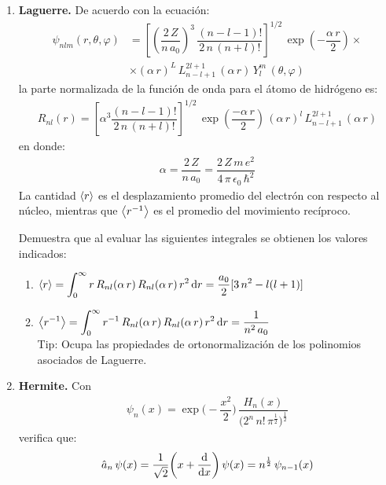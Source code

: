 \begin{enumerate}
\item \textbf{Laguerre. } De acuerdo con la ecuación:
\begin{align*}
\psi_{n l m} (r , \theta, \varphi) &= \left[ \left( \dfrac{2 \, Z}{n \, a_{0}} \right)^{3} \, \dfrac{(n - l -1)!}{2 \, n \, (n + l)!} \right]^{1/2} \, \exp \left( - \dfrac{\alpha \, r}{2} \right) \times \\[1em]
&\times (\alpha \, r)^{L} \, L_{n - l +1}^{2 l +1} \, (\alpha \, r) \, Y_{l}^{m} \, (\theta, \varphi)
\end{align*}
la parte normalizada de la función de onda para el átomo de hidrógeno es:
\begin{align*}
R_{n l} (r) = \left[ \alpha^{3} \dfrac{(n -l -1)!}{2 \, n \, (n + l)!} \right]^{1/2} \, \exp \left( \dfrac{-\alpha \, r}{2} \right) \, (\alpha \, r)^{l} \, L_{n - l +1}^{2 l +1} \, (\alpha \, r) 
\end{align*}
en donde: 
\begin{align*}
\alpha = \dfrac{2 \, Z}{n \, a_{0}} = \dfrac{2 \, Z \, m \, e^{2}}{4 \, \pi \, \epsilon_{0} \, \hbar^{2}}
\end{align*}
La cantidad $\expval{r}$ es el desplazamiento promedio del electrón con respecto al núcleo, mientras que $\expval{r^{-1}}$ es el promedio del movimiento recíproco.
\par
Demuestra que al evaluar las siguientes integrales se obtienen los valores indicados:
\begin{enumerate}
\item $\displaystyle \expval{r} = \int_{0}^{\infty} r \, R_{n l} (\alpha \, r) \, R_{n l} (\alpha \, r) \, r^{2} \dd{r} = \dfrac{a_{0}}{2} [3 \, n^{2} - l (l + 1)]$
\item $\displaystyle \expval{r^{-1}} = \int_{0}^{\infty} r^{-1} \, R_{n l} (\alpha \, r) \, R_{n l} (\alpha \, r) \, r^{2} \dd{r} = \dfrac{1}{n^{2} \, a_{0}}$
\\[0.5em]
Tip: Ocupa las propiedades de ortonormalización de los polinomios asociados de Laguerre.
\end{enumerate}
\item \textbf{Hermite. }Con
\begin{align*}
\psi_{n} (x) = \exp \bigg( - \dfrac{x^{2}}{2} \bigg) \, \dfrac{H_{n}(x)}{\big( 2^{n} \, n! \, \pi^{\frac{1}{2}})^{\frac{1}{2}}}
\end{align*}
verifica que:
\begin{align*}
\hat{a}_{n} \, \psi (x) &= \dfrac{1}{\sqrt{2}} \bigg( x + \dv{x} \bigg) \, \psi (x) = n^{\frac{1}{2}} \, \psi_{n-1} (x) \\[0.5em]

\end{align*}
\end{enumerate}
